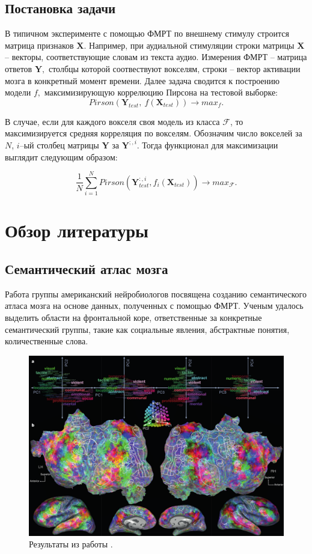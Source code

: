 \documentclass[pdftex,ptm,12pt,a4paper]{report}
\theoremstyle{definition}
\begin{document}
\section{Постановка задачи}

В типичном эксперименте с помощью ФМРТ по внешнему стимулу строится матрица признаков $\textbf{X}.$ Например, при аудиальной стимуляции строки матрицы $\textbf{X}$ -- векторы, соответствующие словам из текста аудио. Измерения ФМРТ -- матрица ответов $\textbf{Y},$ столбцы которой соотвествуют вокселям, строки -- вектор активации мозга в конкретный момент времени. Далее задача сводится к построению модели $f,$ максимизирующую коррелюцию Пирсона на тестовой выборке:
$$Pirson(\textbf{Y}_{test},\ f(\textbf{X}_{test})) \rightarrow max_{f}.$$

В случае, если для каждого вокселя своя модель из класса $\mathcal{F}$, то максимизируется средняя корреляция по вокселям. Обозначим число вокселей за $N$, $i$--ый столбец матрицы $\textbf{Y}$ за $\textbf{Y}^{;,i}$. Тогда функционал для максимизации выглядит следующим образом:

$$\frac{1}{N} \sum_{i=1}^{N} Pirson(\textbf{Y}_{test}^{:,i}, f_{i}(\textbf{X}_{test})) \rightarrow max_{\mathcal{F}}.$$


\chapter{Обзор литературы}
\section{Семантический атлас мозга}\label{complex}


Работа \cite{huth2016natural} группы американский нейробиологов посвящена созданию семантического атласа мозга на основе данных, полученных с помощью ФМРТ. Ученым удалось выделить области на фронтальной коре, ответственные за конкретные семантический группы, такие как социальные явления, абстрактные понятия, количественные слова. 

\begin{figure}[h]
\includegraphics[scale=0.4]{images/galant_results.png}
\centering
\caption{Результаты из работы \cite{huth2016natural}.}
\label{huth_result}
\end{figure}
\end{document}
